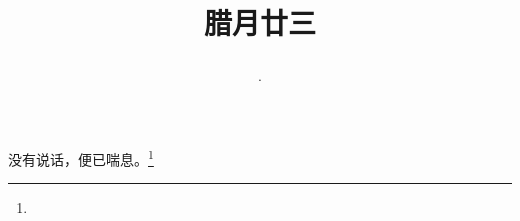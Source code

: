 \title{\date[d=2,m=2,y=2024][year:cn-y,年,month:cn,day:cn,日,·,weekday]·腊月廿三 }
没有说话，便已喘息。\footnote{ }

